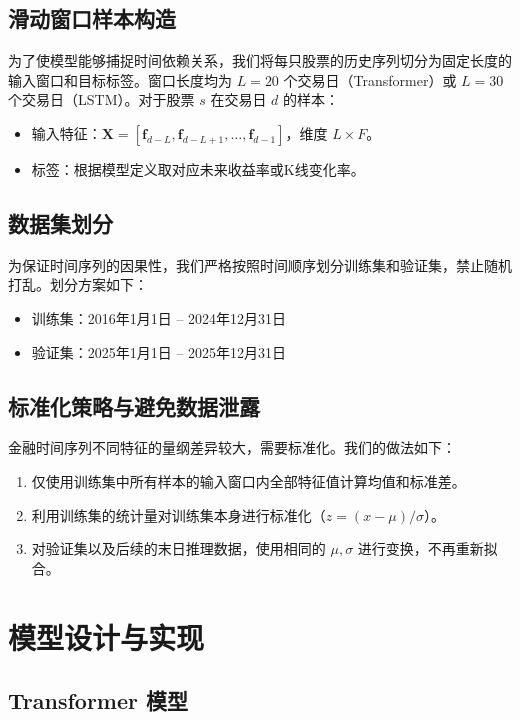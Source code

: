 \documentclass[12pt,a4paper]{ctexart}
\begin{document}
	\subsection{滑动窗口样本构造}
	为了使模型能够捕捉时间依赖关系，我们将每只股票的历史序列切分为固定长度的输入窗口和目标标签。窗口长度均为 \(L=20\) 个交易日（Transformer）或 \(L=30\) 个交易日（LSTM）。对于股票 \(s\) 在交易日 \(d\) 的样本：
	\begin{itemize}
		\item 输入特征：\(\mathbf{X} = [\mathbf{f}_{d-L}, \mathbf{f}_{d-L+1}, \ldots, \mathbf{f}_{d-1}]\)，维度 \(L \times F\)。
		\item 标签：根据模型定义取对应未来收益率或K线变化率。
	\end{itemize}
	
	\subsection{数据集划分}
	为保证时间序列的因果性，我们严格按照时间顺序划分训练集和验证集，禁止随机打乱。划分方案如下：
	\begin{itemize}
		\item 训练集：2016年1月1日 – 2024年12月31日
		\item 验证集：2025年1月1日 – 2025年12月31日
	\end{itemize}
	
	\subsection{标准化策略与避免数据泄露}
	金融时间序列不同特征的量纲差异较大，需要标准化。我们的做法如下：
	\begin{enumerate}
		\item 仅使用训练集中所有样本的输入窗口内全部特征值计算均值和标准差。
		\item 利用训练集的统计量对训练集本身进行标准化（\(z = (x - \mu)/\sigma\)）。
		\item 对验证集以及后续的末日推理数据，使用相同的 \(\mu, \sigma\) 进行变换，不再重新拟合。
	\end{enumerate}
	
	\section{模型设计与实现}
	
	\subsection{Transformer 模型}
\end{document}
